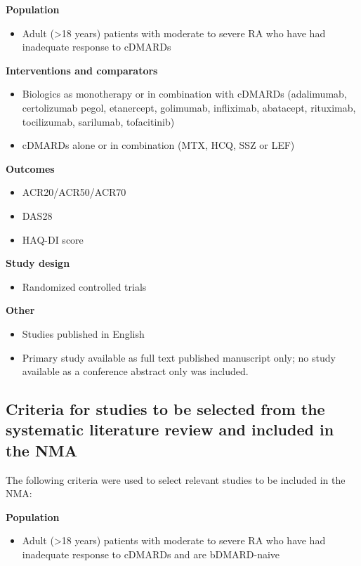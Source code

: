 \documentclass[11pt,final,fleqn]{article}\usepackage[]{graphicx}\usepackage[]{color}
\theoremstyle{plain}
\begin{document}
\begin{appendices}
\textbf{Population}
\begin{itemize}
\item Adult (\textgreater{}18 years) patients with moderate to severe RA who have had inadequate response to cDMARDs
\end{itemize}

\textbf{Interventions and comparators}

\begin{itemize}
\item Biologics as monotherapy or in combination with cDMARDs (adalimumab, certolizumab pegol, etanercept, golimumab, infliximab, abatacept, rituximab, tocilizumab, sarilumab, tofacitinib)

\item cDMARDs alone or in combination (MTX, HCQ, SSZ or LEF)
\end{itemize}

\textbf{Outcomes}
\begin{itemize}
\item ACR20/ACR50/ACR70
\item DAS28
\item HAQ-DI score
\end{itemize}

\textbf{Study design}
\begin{itemize}
\item Randomized controlled trials
\end{itemize}

\textbf{Other}

\begin{itemize}
\item Studies published in English
\item Primary study available as full text published manuscript only; no study available as a conference abstract only was included.
\end{itemize}

\subsection{Criteria for studies to be selected from the systematic literature review and included in the NMA}\label{criteria-for-studies-to-be-selected-from-the-systematic-literature-review-and-included-in-the-nma}

The following criteria were used to select relevant studies to be included in the NMA:

\textbf{Population}

\begin{itemize}
\item Adult (\textgreater{}18 years) patients with moderate to severe RA who have had inadequate response to cDMARDs and are bDMARD-naive
\end{itemize}


\end{appendices}
\end{document}

